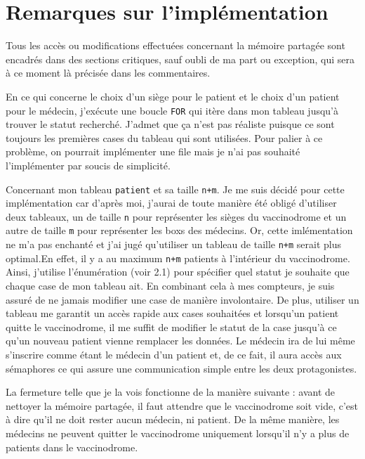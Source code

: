\documentclass[a4paper]{article}
\begin{document}
\newpage

\section{Remarques sur l'implémentation}

Tous les accès ou modifications effectuées concernant la mémoire partagée sont encadrés dans des sections critiques, sauf oubli de ma part ou exception, qui sera à ce moment là précisée dans les commentaires.
\bigskip \par
En ce qui concerne le choix d'un siège pour le patient et le choix d'un patient pour le médecin, j'exécute une boucle \texttt{FOR} qui itère dans mon tableau jusqu'à trouver le statut recherché. J'admet que ça n'est pas réaliste puisque ce sont toujours les premières cases du tableau qui sont utilisées. Pour palier à ce problème, on pourrait implémenter une file mais je n'ai pas souhaité l'implémenter par soucis de simplicité.
\bigskip \par
Concernant mon tableau \texttt{patient} et sa taille \texttt{n+m}. Je me suis décidé pour cette implémentation car d'après moi, j'aurai de toute manière été obligé d'utiliser deux tableaux, un de taille \texttt{n} pour représenter les sièges du vaccinodrome et un autre de taille \texttt{m} pour représenter les boxs des médecins. Or, cette imlémentation ne m'a pas enchanté et j'ai jugé qu'utiliser un tableau de taille \texttt{n+m} serait plus optimal.\smallskip \newline En effet, il y a au maximum \texttt{n+m} patients à l'intérieur du vaccinodrome. Ainsi, j'utilise l'énumération (voir 2.1) pour spécifier quel statut je souhaite que chaque case de mon tableau ait. En combinant cela à mes compteurs, je suis assuré de ne jamais modifier une case de manière involontaire. 
De plus, utiliser un tableau me garantit un accès rapide aux cases souhaitées et lorsqu'un patient quitte le vaccinodrome, il me suffit de modifier le statut de la case jusqu'à ce qu'un nouveau patient vienne remplacer les données. Le médecin ira de lui même s'inscrire comme étant le médecin d'un patient et, de ce fait, il aura accès aux sémaphores ce qui assure une communication simple entre les deux protagonistes.
\bigskip \par
La fermeture telle que je la vois fonctionne de la manière suivante : avant de nettoyer la mémoire partagée, il faut attendre que le vaccinodrome soit vide, c'est à dire qu'il ne doit rester aucun médecin, ni patient. De la même manière, les médecins ne peuvent quitter le vaccinodrome uniquement lorsqu'il n'y a plus de patients dans le vaccinodrome. 
\end{document}
